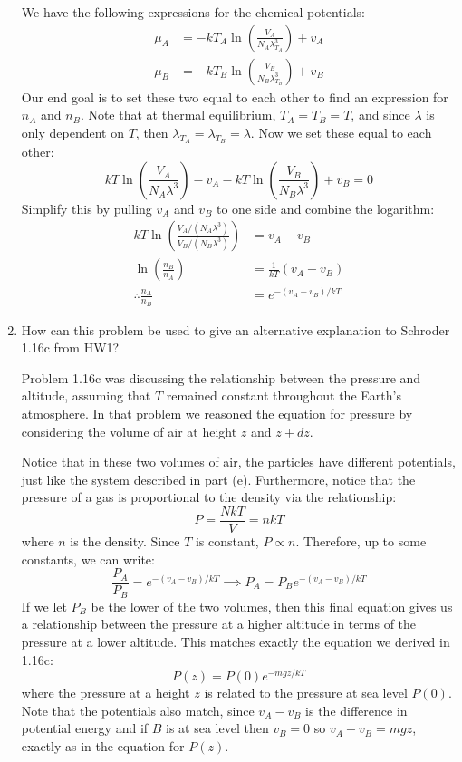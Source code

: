 \documentclass[10pt]{article}
\begin{document}
\begin{enumerate}[label=\alph*)]
			\begin{solution}
				We have the following expressions for the chemical potentials:
				\begin{align*}
					\mu_A &=  -kT_A\ln \left( \frac{V_A}{N_A \lambda_{T_A}^3} \right) + v_A \\
					\mu_B &= -kT_B\ln \left( \frac{V_B}{N_B \lambda_{T_B}^3} \right) + v_B 
				\end{align*}
				Our end goal is to set these two equal to each other to find an expression for $n_A$ and $n_B$.
				Note that at thermal equilibrium, $T_A = T_B = T$, and since $\lambda$ is only dependent on $T$,
				then $\lambda_{T_A} = \lambda_{T_B} = \lambda$. Now we set these equal to each other:
				\[
					kT \ln\left( \frac{V_A}{N_A \lambda^3}\right) - v_A - kT\ln\left( \frac{V_B}{N_B \lambda^3} \right)  + v_B = 0
				\]
				Simplify this by pulling $v_A$ and $v_B$ to one side and combine the logarithm:
				\begin{align*}
					kT \ln \left( \frac{V_A / (N_A \lambda^3)}{V_B / (N_B \lambda^3)} \right) &= v_A - v_B\\
					\ln \left( \frac{n_B}{n_A} \right) &= \frac{1}{kT}(v_A - v_B) \\
					\therefore \frac{n_A}{n_B} &= e^{-(v_A - v_B) / kT}
				\end{align*}
			\end{solution}
		\item How can this problem be used to give an alternative explanation to Schroder 1.16c from HW1? 

			\begin{solution}
				Problem 1.16c was discussing the relationship between the pressure and altitude, assuming
				that $T$ remained constant throughout the Earth's atmosphere. In that problem we 
				reasoned the equation for pressure by considering the volume of air at height $z$ and $z + dz$.

				Notice that in these two volumes of air, the particles have different
				potentials, just like the system described in part (e). Furthermore, notice that 
				the pressure of a gas is proportional to the density via the relationship:
				\[
					P = \frac{NkT}{V} = nkT
				\] 
				where $n$ is the density. Since $T$ is constant, $P \propto n$. Therefore, up to 
				some constants, we can write:
				\[
					\frac{P_A}{P_B} = e^{-(v_A - v_B) /kT} \implies P_A = P_B e^{-(v_A - v_B) / kT}
				\] 
				If we let $P_B$ be the lower of the two volumes, then this final equation gives us a 
				relationship between the pressure at a higher altitude in terms of the pressure 
				at a lower altitude. This matches exactly the equation we derived in 1.16c:
				\[
					P(z) = P(0) e^{-mgz / kT}
				\] 
				where the pressure at a height $z$ is related to the pressure at sea level $P(0)$. Note 
				that the potentials also match, since $v_A - v_B$ is the difference in potential energy 
				and if $B$ is at sea level then $v_B = 0$ so $v_A - v_B = mgz$, exactly as in the 
				equation for $P(z)$. 
			\end{solution}
	\end{enumerate}
\end{document}
